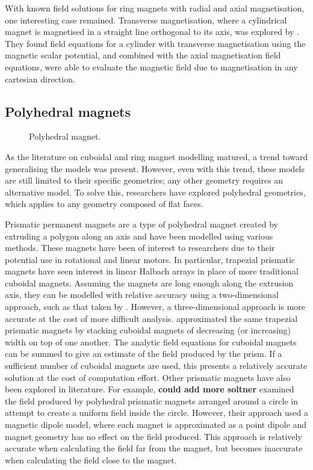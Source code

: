 With known field solutions for ring magnets with radial and axial magnetisation, one interesting case remained. Transverse magnetisation, where a cylindrical magnet is magnetised in a straight line orthogonal to its axis, was explored by \textcite{Caciagli2018}. They found field equations for a cylinder with transverse magnetisation using the magnetic scalar potential, and combined with the axial magnetisation field equations, were able to evaluate the magnetic field due to magnetisation in any cartesian direction.

\subsection{Polyhedral magnets}

\begin{figure}
    \centering
    \vspace{5cm}
    \caption{Polyhedral magnet.}
    \label{fig:polyhedralMagnetSchematic}
\end{figure}

As the literature on cuboidal and ring magnet modelling matured, a trend toward generalising the models was present. However, even with this trend, these models are still limited to their specific geometries; any other geometry requires an alternative model. To solve this, researchers have explored polyhedral geometries, which applies to any geometry composed of flat faces.

Prismatic permanent magnets are a type of polyhedral magnet created by extruding a polygon along an axis and have been modelled using various methods. These magnets have been of interest to researchers due to their potential use in rotational and linear motors. In particular, trapezial prismatic magnets have seen interest in linear Halbach arrays in place of more traditional cuboidal magnets. Assuming the magnets are long enough along the extrusion axis, they can be modelled with relative accuracy using a two-dimensional approach, such as that taken by \textcite{Lee2004}. However, a three-dimensional approach is more accurate at the cost of more difficult analysis. \textcite{Meessen2008} approximated the same trapezial prismatic magnets by stacking cuboidal magnets of decreasing (or increasing) width on top of one another. The analytic field equations \cite{Akoun1984,Ravaud2009} for cuboidal magnets can be summed to give an estimate of the field produced by the prism. If a sufficient number of cuboidal magnets are used, this presents a relatively accurate solution at the cost of computation effort. Other prismatic magnets have also been explored in literature. For example, \textcite{Soltner2010} \textbf{could add more soltner} examined the field produced by polyhedral prismatic magnets arranged around a circle in attempt to create a uniform field inside the circle. However, their approach used a magnetic dipole model, where each magnet is approximated as a point dipole and magnet geometry has no effect on the field produced. This approach is relatively accurate when calculating the field far from the magnet, but becomes inaccurate when calculating the field close to the magnet.

